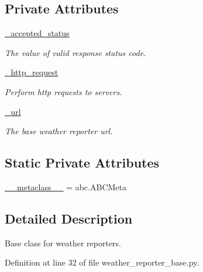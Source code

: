 \subsection*{Private Attributes}
\begin{DoxyCompactItemize}
\item 
\hyperlink{classrapp__weather__reporter_1_1weather__reporter__base_1_1WeatherReporterBase_adbd388f1ab76eab66fb4d98339c50a34}{\-\_\-accepted\-\_\-status}
\begin{DoxyCompactList}\small\item\em The value of valid response status code. \end{DoxyCompactList}\item 
\hyperlink{classrapp__weather__reporter_1_1weather__reporter__base_1_1WeatherReporterBase_a1421dd02127a1b5a337d7e95260b2d65}{\-\_\-http\-\_\-request}
\begin{DoxyCompactList}\small\item\em Perform http requests to servers. \end{DoxyCompactList}\item 
\hyperlink{classrapp__weather__reporter_1_1weather__reporter__base_1_1WeatherReporterBase_adba60d6002ff377cf99a86bade077a07}{\-\_\-url}
\begin{DoxyCompactList}\small\item\em The base weather reporter url. \end{DoxyCompactList}\end{DoxyCompactItemize}
\subsection*{Static Private Attributes}
\begin{DoxyCompactItemize}
\item 
\hyperlink{classrapp__weather__reporter_1_1weather__reporter__base_1_1WeatherReporterBase_a6256451c2bd46583f7af4b37733d2ffe}{\-\_\-\-\_\-metaclass\-\_\-\-\_\-} = abc.\-A\-B\-C\-Meta
\end{DoxyCompactItemize}


\subsection{Detailed Description}
Base class for weather reporters. 

Definition at line 32 of file weather\-\_\-reporter\-\_\-base.\-py.



